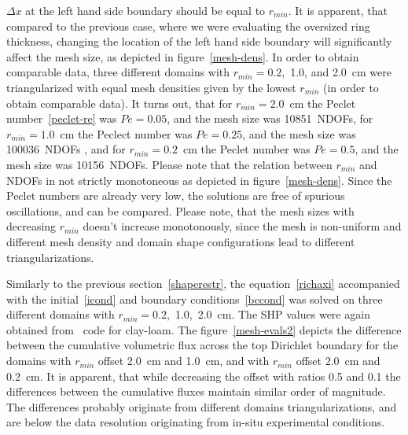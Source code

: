 \documentclass[review,times,3p,10pt]{elsarticle}
\begin{document}
{{ $\Delta x$ at the left hand side boundary should be equal to $r_{min}$. It is apparent, that compared to the previous case, where we were evaluating the oversized ring thickness, changing the location of the left hand side boundary will significantly affect the mesh size, as depicted in figure~\ref{mesh-dens}. In order to obtain comparable data,  three different domains with $r_{min}=0.2$,~1.0, and 2.0~cm  were triangularized with equal mesh densities given by the lowest $r_{min}$  (in order to obtain comparable data). It turns out, that for $r_{min}=2.0$~cm the Peclet number~\eqref{peclet-re} was $Pe=0.05$, and the mesh size was 10851~NDOFs, for $r_{min}=1.0$~cm the Peclect number was $Pe=0.25$, and the mesh size was 100036~NDOFs , and for $r_{min}=0.2$~cm the Peclet number was $Pe=0.5$, and the mesh size was 10156~NDOFs. Please note that the relation between $r_{min}$ and NDOFs in not strictly monotoneous as depicted in figure~\ref{mesh-dens}. Since the Peclet numbers are already very low, the solutions are free of spurious oscillations, and can be compared. Please note, that the mesh sizes with decreasing $r_{min}$ doesn't increase monotonously, since the mesh is non-uniform and different mesh density and domain shape configurations lead to different triangularizations.
 
 Similarly to the previous section~\ref{shaperestr}, the equation~\eqref{richaxi} accompanied with the initial~\eqref{icond} and boundary conditions~\eqref{bccond} was solved on three different domains with $r_{min}=0.2$,~1.0,~2.0~cm. The SHP values were again obtained from~\citep{retc} code for clay-loam. The figure~\ref{mesh-evals2} depicts the difference between the cumulative volumetric flux across  the top Dirichlet boundary for the domains with $r_{min}$ offset 2.0~cm and 1.0~cm, and with $r_{min}$ offset 2.0~cm and 0.2~cm. It is apparent, that while decreasing the offset with ratios 0.5 and 0.1 the differences between the cumulative fluxes maintain similar order of magnitude. The differences probably originate from different domains triangularizations, and are below the data resolution originating from in-situ experimental conditions. 
 
 }



}
\end{document}
